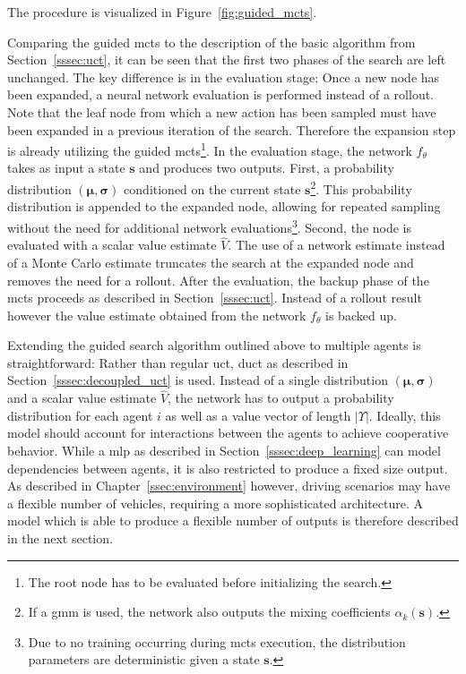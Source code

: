 The procedure is visualized in Figure~\ref{fig:guided_mcts}.

Comparing the guided \gls{mcts} to the description of the basic algorithm from Section~\ref{sssec:uct}, it can be seen that the first two phases of the search are left unchanged. The key difference is in the evaluation stage: Once a new node has been expanded, a neural network evaluation is performed instead of a rollout. Note that the leaf node from which a new action has been sampled must have been expanded in a previous iteration of the search. Therefore the expansion step is already utilizing the guided \gls{mcts}\footnote{The root node has to be evaluated before initializing the search.}. In the evaluation stage, the network $f_\theta$ takes as input a state $\mathbf s$ and produces two outputs. First, a probability distribution $(\pmb \mu, \pmb \sigma)$ conditioned on the current state $\mathbf s$\footnote{If a \gls{gmm} is used, the network also outputs the mixing coefficients $\alpha_k (\mathbf s)$.}. This probability distribution is appended to the expanded node, allowing for repeated sampling without the need for additional network evaluations\footnote{Due to no training occurring during \gls{mcts} execution, the distribution parameters are deterministic given a state $\mathbf s$.}. Second, the node is evaluated with a scalar value estimate $\hat V$. The use of a network estimate instead of a Monte Carlo estimate truncates the search at the expanded node and removes the need for a rollout. After the evaluation, the backup phase of the \gls{mcts} proceeds as described in Section~\ref{sssec:uct}. Instead of a rollout result however the value estimate obtained from the network $f_\theta$ is backed up.

Extending the guided search algorithm outlined above to multiple agents is straightforward: Rather than regular \gls{uct}, \gls{duct} as described in Section~\ref{sssec:decoupled_uct} is used. Instead of a single distribution $(\pmb \mu, \pmb \sigma)$ and a scalar value estimate $\hat V$, the network has to output a probability distribution for each agent $i$ as well as a value vector of length $|\Upsilon|$. Ideally, this model should account for interactions between the agents to achieve cooperative behavior. While a \gls{mlp} as described in Section~\ref{sssec:deep_learning} can model dependencies between agents, it is also restricted to produce a fixed size output. As described in Chapter~\ref{ssec:environment} however, driving scenarios may have a flexible number of vehicles, requiring a more sophisticated architecture. A model which is able to produce a flexible number of outputs is therefore described in the next section.

